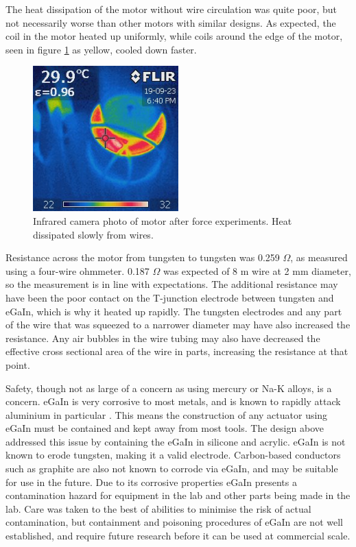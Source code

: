 \documentclass[a4paper,12pt]{article}
\begin{document}
The heat dissipation of the motor without wire circulation was quite poor, but not necessarily worse than other motors with similar designs. As expected, the coil in the motor heated up uniformly, while coils around the edge of the motor, seen in figure \ref{fg:afterexperiment} as yellow, cooled down faster.
\begin{figure}[h!]
    \centering
    \includegraphics[width=0.5\textwidth]{coilheat.jpg}
    \caption{Infrared camera photo of motor after force experiments. Heat dissipated  slowly from wires.}
    \label{fg:afterexperiment}
\end{figure}

Resistance across the motor from tungsten to tungsten was 0.259 $\Omega$, as measured using a four-wire ohmmeter. 0.187 $\Omega$ was expected of 8 m wire at 2 mm diameter, so the measurement is in line with expectations. The additional resistance may have been the poor contact on the T-junction electrode between tungsten and eGaIn, which is why it heated up rapidly. The tungsten electrodes and any part of the wire that was squeezed to a narrower diameter may have also increased the resistance. Any air bubbles in the wire tubing may also have decreased the effective cross sectional area of the wire in parts, increasing the resistance at that point.

Safety, though not as large of a concern as using mercury or Na-K alloys, is a concern. eGaIn is very corrosive to most metals, and is known to rapidly attack aluminium in particular \cite{cuiLiquidMetalCorrosion2018}. This means the construction of any actuator using eGaIn must be contained and kept away from most tools. The design above addressed this issue by containing the eGaIn in silicone and acrylic. eGaIn is not known to erode tungsten, making it a valid electrode. Carbon-based conductors such as graphite are also not known to corrode via eGaIn, and may be suitable for use in the future. Due to its corrosive properties eGaIn presents a contamination hazard for equipment in the lab and other parts being made in the lab. Care was taken to the best of abilities to minimise the risk of actual contamination, but containment and poisoning procedures of eGaIn are not well established, and require future research before it can be used at commercial scale.
\end{document}
